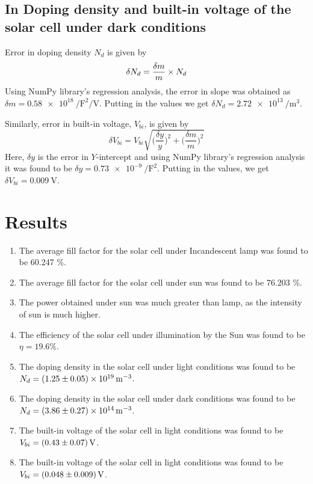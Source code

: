 \documentclass[%
 aip,
 amsmath,amssymb,
 reprint, floatfix%
]{revtex4-2}
\begin{document}
    \subsection{In Doping density and built-in voltage of the solar cell under dark conditions}
        Error in doping density $N_d$ is given by
        \begin{equation}
            \delta N_d = \dfrac{\delta m}{m} \times N_d \\
        \end{equation}
        Using NumPy library's regression analysis, the error in slope was obtained as $\delta m = \SI{0.58e18}{\per \farad \squared \per \volt}$. Putting in the values we get $\delta N_d = \SI{2.72e13}{\per \metre \cubed}$.
        \par
        Similarly, error in built-in voltage, $V_{bi}$, is given by
        \begin{equation}
            \delta V_{bi} = V_{bi} \sqrt{\Big( \dfrac{\delta y}{y} \Big)^2 + \Big( \dfrac{\delta m}{m} \Big)^2}
        \end{equation}
        Here, $\delta y$ is the error in $Y$-intercept and using NumPy library's regression analysis it was found to be $\delta y = \SI{0.73e-9}{\per \farad \squared}$. Putting in the values, we get $\delta V_{bi} = \SI{0.009}{\volt}$. 
    
\section{Results}
    \begin{enumerate}
        \item The average fill factor for the solar cell under Incandescent lamp was found to be 60.247 \%.
        \item The average fill factor for the solar cell under sun was found to be 76.203 \%.
        \item The power obtained under sun was much greater than lamp, as the intensity of sun is much higher.
        \item The efficiency of the solar cell under illumination by the Sun was found to be $\eta = 19.6 \%$.
        \item The doping density in the solar cell under light conditions was found to be $N_d = \SI[separate-uncertainty=true]{1.25 \pm 0.05e19}{\per \metre \cubed}$.
        \item The doping density in the solar cell under dark conditions was found to be $N_d = \SI[separate-uncertainty=true]{3.86 \pm 0.27e14}{\per \metre \cubed}$.
        \item The built-in voltage of the solar cell in light conditions was found to be $V_{bi} = \SI[separate-uncertainty=true]{0.43 \pm 0.07}{\volt}$.
        \item The built-in voltage of the solar cell in light conditions was found to be $V_{bi} = \SI[separate-uncertainty=true]{0.048 \pm 0.009}{\volt}$.
    \end{enumerate}
\end{document}
